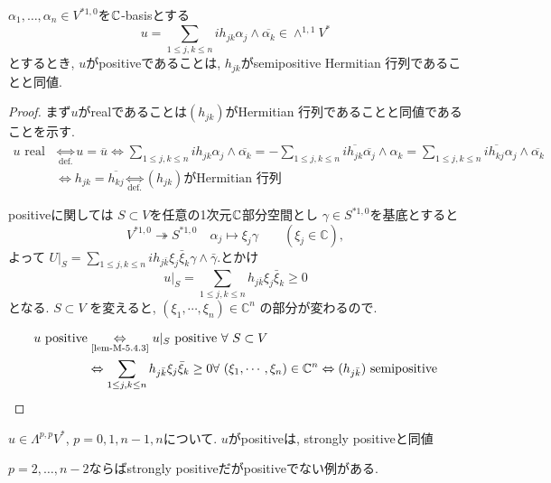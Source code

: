 \begin{tcolorbox}[mybox]
\begin{lem}
\label{lem-M-6.4.1}
$\alpha_1, \ldots, \alpha_n \in V^{*1,0}$を$\mathbb{C}$-basisとする
$$
u = \sum_{1 \le j, k \le n} i h_{jk}\alpha_j\wedge \overline{\alpha_k} 
\in \wedge^{1,1} V^{*}
$$
とするとき, 
$u$がpositiveであることは, $h_{jk}$がsemipositive Hermitian 行列であることと同値. 
\end{lem}
\end{tcolorbox}
\begin{proof}
まず$u$がrealであることは$(h_{jk})$がHermitian 行列であることと同値であることを示す. 
\begin{align*}
\text{$u$ real}
&\underset{\text{def.}}{\Leftrightarrow }
u = \overline{u}
\underset{}{\Leftrightarrow }
\sum_{1 \le j, k \le n} i h_{jk}\alpha_j\wedge \overline{\alpha_k} 
=
-\sum_{1 \le j, k \le n} i\overline{h_{jk}} \overline{\alpha_j}\wedge \alpha_k
=
\sum_{1 \le j, k \le n} i\overline{ h_{kj}}\alpha_j\wedge \overline{\alpha_k} 
\\
&\underset{}{\Leftrightarrow }
 h_{jk} = \overline{ h_{kj}}
 \underset{\text{def.}}{\Leftrightarrow }
 \text{$(h_{jk})$がHermitian 行列}
\end{align*}

positiveに関しては
$S \subset V$を任意の1次元$\mathbb{C}$部分空間とし
$\gamma \in S^{*1, 0}$を基底とすると
$$
V^{*1,0} \twoheadrightarrow S^{*1, 0}
\quad 
\alpha_j \longmapsto \xi_j \gamma
\qquad
(\xi_j \in \mathbb{C}),
$$
よって
\(
U|_S
=
\sum_{1\leq j,k\leq n}
i h_{j\bar{k}}\xi_j \bar{\xi}_k \gamma \wedge \bar{\gamma}.
\)とかけ
\[
u|_S 
=
\sum_{1\leq j,k\leq n}
h_{j\bar{k}}\xi_j\bar{\xi}_k \geq 0
\]
となる. 
 \(S \subset V\) を変えると, \((\xi_1,\cdots,\xi_n)\in \mathbb{C}^n\)
の部分が変わるので.

\begin{align*}
u\text{ positive}
&\underset{\text{\ref{lem-M-5.4.3}}}{\Leftrightarrow }
u|_{S} \text{ positive $\forall$ $S \subset V$}
\\
&\underset{}{\Leftrightarrow }
\sum_{1\leq j,k\leq n}
h_{j\bar{k}}\xi_j\bar{\xi}_k \geq 0
\text{$\forall$ \((\xi_1,\cdots,\xi_n)\in \mathbb{C}^n\)}
\underset{}{\Leftrightarrow }
(h_{j\bar{k}}) \text{ semipositive}
\end{align*}
\end{proof}


\begin{tcolorbox}[mybox]
\begin{lem}
\label{lem-M-6.4.2}
 \(u \in \Lambda^{p,p}V^*\), \(p=0,1,n-1,n\)について. 
\(u\)がpositiveは, strongly positiveと同値
\end{lem}
\end{tcolorbox}
$p=2, \ldots, n-2$ならばstrongly positiveだがpositiveでない例がある. 

